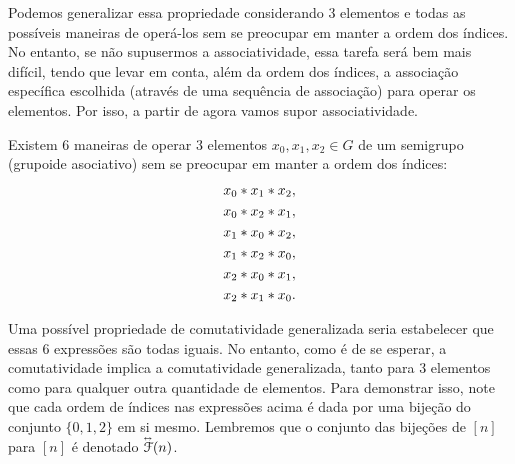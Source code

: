 Podemos generalizar essa propriedade considerando $3$ elementos e todas as possíveis maneiras de operá-los sem se preocupar em manter a ordem dos índices. No entanto, se não supusermos a associatividade, essa tarefa será bem mais difícil, tendo que levar em conta, além da ordem dos índices, a associação específica escolhida (através de uma sequência de associação) para operar os elementos. Por isso, a partir de agora vamos supor associatividade.

Existem $6$ maneiras de operar $3$ elementos $x_0, x_1, x_2 \in G$ de um semigrupo (grupoide asociativo) sem se preocupar em manter a ordem dos índices:
	\begin{align*}
	& x_0 \ast x_1 \ast x_2, \\
	& x_0 \ast x_2 \ast x_1, \\
	& x_1 \ast x_0 \ast x_2, \\
	& x_1 \ast x_2 \ast x_0, \\
	& x_2 \ast x_0 \ast x_1, \\
	& x_2 \ast x_1 \ast x_0.
	\end{align*}

Uma possível propriedade de comutatividade generalizada seria estabelecer que essas $6$ expressões são todas iguais. No entanto, como é de se esperar, a comutatividade implica a comutatividade generalizada, tanto para $3$ elementos como para qualquer outra quantidade de elementos. Para demonstrar isso, %
note que cada ordem de índices nas expressões acima é dada por uma bijeção do conjunto $\{0,1,2\}$ em si mesmo. Lembremos que o conjunto das bijeções de $[n]$ para $[n]$ é denotado $\accentset{\leftrightarrow}{\mathcal{F}}(n)$.


